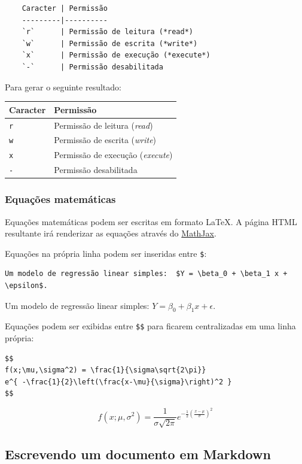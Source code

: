 \documentclass[10pt,a4paper]{book}
\begin{document}
\begin{verbatim}
    Caracter | Permissão
    ---------|----------
    `r`      | Permissão de leitura (*read*)
    `w`      | Permissão de escrita (*write*)
    `x`      | Permissão de execução (*execute*)
    `-`      | Permissão desabilitada
\end{verbatim}

Para gerar o seguinte resultado:

\begin{longtable}[]{@{}ll@{}}
\toprule
Caracter & Permissão\tabularnewline
\midrule
\endhead
\texttt{r} & Permissão de leitura (\emph{read})\tabularnewline
\texttt{w} & Permissão de escrita (\emph{write})\tabularnewline
\texttt{x} & Permissão de execução (\emph{execute})\tabularnewline
\texttt{-} & Permissão desabilitada\tabularnewline
\bottomrule
\end{longtable}

\subsubsection*{Equações
matemáticas}\label{equauxe7uxf5es-matemuxe1ticas}


Equações matemáticas podem ser escritas em formato LaTeX. A página HTML
resultante irá renderizar as equações através do
\href{http://www.mathjax.org}{MathJax}.

Equações na própria linha podem ser inseridas entre \texttt{\$}:

\begin{verbatim}
Um modelo de regressão linear simples:  $Y = \beta_0 + \beta_1 x + \epsilon$.
\end{verbatim}

Um modelo de regressão linear simples:
\(Y = \beta_0 + \beta_1 x + \epsilon\).

Equações podem ser exibidas entre \texttt{\$\$} para ficarem
centralizadas em uma linha própria:

\begin{verbatim}
$$
f(x;\mu,\sigma^2) = \frac{1}{\sigma\sqrt{2\pi}}
e^{ -\frac{1}{2}\left(\frac{x-\mu}{\sigma}\right)^2 }
$$
\end{verbatim}

\[
f(x;\mu,\sigma^2) = \frac{1}{\sigma\sqrt{2\pi}}
e^{ -\frac{1}{2}\left(\frac{x-\mu}{\sigma}\right)^2 }
\]

\subsection{Escrevendo um documento em
Markdown}\label{escrevendo-um-documento-em-markdown}
\end{document}
